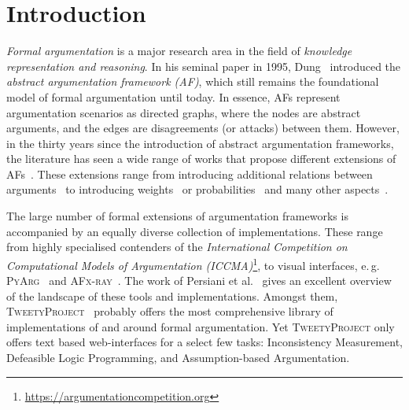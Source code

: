 \documentclass[
]{ceurart}
\newcommand{\tweety}{\textsc{TweetyProject}\xspace}
\begin{document}
  

\maketitle

\section{Introduction}

\emph{Formal argumentation} is a major research area in the field of \emph{knowledge representation and reasoning}.
In his seminal paper in 1995, Dung~\cite{DBLP:journals/ai/Dung95} introduced the \emph{abstract argumentation framework (AF)}, which still remains the foundational model of formal argumentation until today.
In essence, AFs represent argumentation scenarios as directed graphs, where the nodes are abstract arguments, and the edges are disagreements (or attacks) between them. 
However, in the thirty years since the introduction of abstract argumentation frameworks, the literature has seen a wide range of works that propose different extensions of AFs~\cite{DBLP:books/hofa/BaroniGT17,DBLP:books/hofa/GabbayGST21,DBLP:books/hofa/GabbayKST24}.
These extensions range from introducing additional relations between arguments~\cite{DBLP:conf/ecsqaru/CayrolL05a,DBLP:conf/argmas/NielsenP06,DBLP:journals/ai/Modgil09,CaminadaKRU25} to introducing weights~\cite{DBLP:journals/flap/Bistarelli021} or probabilities~\cite{DBLP:books/hofa/HunterPPRT21} and many other aspects~\cite{DBLP:books/hofa/GabbayGST21,DBLP:books/hofa/GabbayKST24}.

The large number of formal extensions of argumentation frameworks is accompanied by an equally diverse collection of implementations. These range from highly specialised contenders of the \emph{International Competition on Computational Models of Argumentation (ICCMA)}\footnote{\url{https://argumentationcompetition.org}}, to visual interfaces, e.\,g. \textsc{PyArg}~\cite{DBLP:conf/ai3/OdekerkenBB23} and \textsc{AFx-ray}~\cite{DBLP:conf/icail/Xia0BL25}. The work of Persiani et al.~\cite{DBLP:conf/comma/PersianiGBKK24} gives an excellent overview of the landscape of these tools and implementations. Amongst them, \tweety~\cite{DBLP:conf/kr/Thimm14, DBLP:journals/ki/Thimm17a} probably offers the most comprehensive library of implementations of and around formal argumentation. Yet \tweety only offers text based web-interfaces for a select few tasks: Inconsistency Measurement, Defeasible Logic Programming, and Assumption-based Argumentation.
\end{document}
